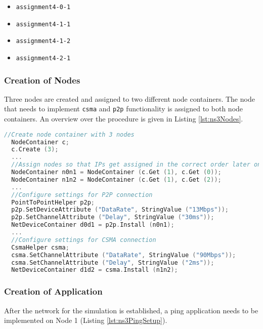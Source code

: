 \documentclass[parskip=full]{scrartcl}
\begin{document}
\begin{itemize}[noitemsep]
    \item \texttt{assignment4-0-1}
    \item \texttt{assignment4-1-1}
    \item \texttt{assignment4-1-2}
    \item \texttt{assignment4-2-1}
\end{itemize}

\subsubsection{Creation of Nodes}
Three nodes are created and assigned to two different node containers.
The node that needs to implement \texttt{csma} and \texttt{p2p} functionality is assigned to both node containers. 
An overview over the procedure is given in Listing \ref{lst:ns3Nodes}.
\begin{lstlisting}[language=c++, breaklines, frame=single, caption={Setup of the nodes and connections}, label=lst:ns3Nodes, float, floatplacement=h]
  //Create node container with 3 nodes
  NodeContainer c;
  c.Create (3);
  ...
  //Assign nodes so that IPs get assigned in the correct order later on
  NodeContainer n0n1 = NodeContainer (c.Get (1), c.Get (0));
  NodeContainer n1n2 = NodeContainer (c.Get (1), c.Get (2));
  ...
  //Configure settings for P2P connection
  PointToPointHelper p2p;
  p2p.SetDeviceAttribute ("DataRate", StringValue ("13Mbps"));
  p2p.SetChannelAttribute ("Delay", StringValue ("30ms"));
  NetDeviceContainer d0d1 = p2p.Install (n0n1);
  ...
  //Configure settings for CSMA connection 
  CsmaHelper csma;
  csma.SetChannelAttribute ("DataRate", StringValue ("90Mbps"));
  csma.SetChannelAttribute ("Delay", StringValue ("2ms"));
  NetDeviceContainer d1d2 = csma.Install (n1n2);
\end{lstlisting}
\subsubsection{Creation of Application}
After the network for the simulation is established, a ping application needs to be implemented on Node 1 (Listing \ref{lst:ns3PingSetup}).
 
\end{document}
